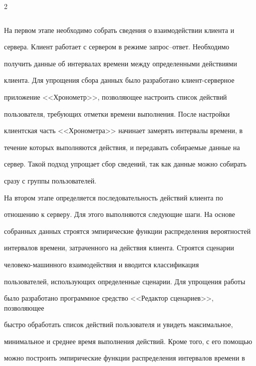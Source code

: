 \begin{multicols}{2}
\begin{table}[b]
\begin{center}
\begin{tabular}{|l|l|c|c|}
\hline

\end{tabular}

\end{center}

\end{table}





  На первом этапе необходимо собрать сведения о взаимодействии клиента и 

сервера. Клиент работает с сервером в режиме за\-прос--от\-вет. Необходимо 

получить данные об интервалах времени между определенными действиями 

клиента. Для упрощения сбора данных было разработано клиент-серверное 

приложение <<Хронометр>>, позволяющее настроить список действий 

пользователя, требующих отметки времени выполнения. После настройки 

клиентская часть <<Хронометра>> начинает замерять интервалы времени, в 

течение которых выполняются действия, и передавать собираемые данные на 

сервер. Такой подход упрощает сбор сведений, так как данные можно собирать 

сразу с группы пользователей.

  

  На втором этапе определяется последовательность действий клиента по 

отношению к серверу. Для этого выполняются следующие шаги. На основе 

собранных данных строятся эмпирические функции распределения вероятностей 

интервалов времени, затраченного на действия клиента. Строятся сценарии 

  че\-ло\-ве\-ко-ма\-шин\-но\-го взаимодействия и вводится классификация 

пользователей, использующих определенные сценарии. Для упрощения работы 

было разработано программное средство <<Редактор сценариев>>, позволяющее 

быстро обработать список действий пользователя и увидеть максимальное, 

минимальное и среднее время выполнения действий. Кроме того, с его помощью 

можно построить эмпирические функции распределения интервалов времени в 


\end{multicols}
